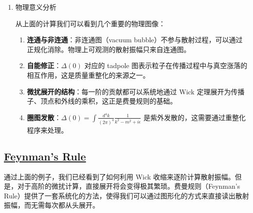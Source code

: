 \begin{example}
\begin{solution}
\begin{enumerate}
\begin{itemize}
                做傅里叶变换到动量空间，我们得到
                \begin{eqnarray*}
                    \mathcal{A}^{(2)} &=& \frac{(-i\lambda)^2}{2} \cdot C_{\text{conn}} \cdot \frac{i}{(q-p)^2 - m^2 + i\epsilon} \cdot \left[\Delta(0)\right]^2 \cdot (2\pi)^4\delta^{(4)}(q-p) \\
                    &+& \frac{(-i\lambda)^2}{2} \cdot C_{\text{disc}} \cdot \left[\Delta(0)\right]^4 \cdot (2\pi)^4\delta^{(4)}(q-p)
                \end{eqnarray*}
            \end{itemize}

            \item[Step 8] 物理意义分析

            从上面的计算我们可以看到几个重要的物理图像：

            \begin{enumerate}
                \item \textbf{连通与非连通}：非连通图（vacuum bubble）不参与散射过程，可以通过正规化消除。物理上可观测的散射振幅只来自连通图。
                
                \item \textbf{自能修正}：$\Delta(0)$ 对应的 tadpole 图表示粒子在传播过程中与真空涨落的相互作用，这是质量重整化的来源之一。
                
                \item \textbf{微扰展开的结构}：每一阶的贡献都可以系统地通过 Wick 定理展开为传播子、顶点和外线的乘积，这正是费曼规则的基础。
                
                \item \textbf{圈图发散}：$\Delta(0) = \int \frac{d^4k}{(2\pi)^4} \frac{1}{k^2-m^2+i\epsilon}$ 是紫外发散的，这需要通过重整化程序来处理。
            \end{enumerate}
        \end{enumerate}
    \end{solution}
\end{example}


\subsection{\protect\hyperlink{:}{Feynman's Rule}}

通过上面的例子，我们已经看到了如何利用 Wick 收缩来逐阶计算散射振幅。但是，对于高阶的微扰计算，直接展开将会变得极其繁琐。费曼规则（Feynman's Rule）提供了一套系统化的方法，使得我们可以通过图形化的方式来直接读出散射振幅，而无需每次都从头展开。

